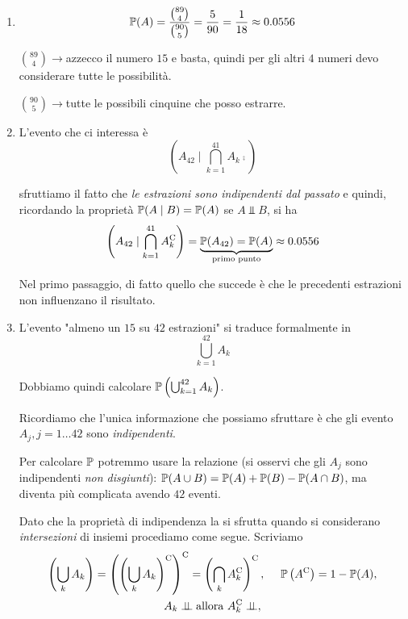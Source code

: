 \begin{enumerate}
\item \begin{equation*}
\mathbb{P}( A) =\frac{\binom{89}{4}}{\binom{90}{5}} =\frac{5}{90} =\frac{1}{18} \approx 0.0556
\end{equation*}

$\binom{89}{4}\rightarrow $azzecco il numero $15$ e basta, quindi per gli altri $4$ numeri devo considerare tutte le possibilità.

$\binom{90}{5}\rightarrow $tutte le possibili cinquine che posso estrarre.
\item L'evento che ci interessa è\begin{equation*}
\left( A_{42} \mid \bigcap _{k=1}^{41} A_{k}\comp\right)
\end{equation*}

sfruttiamo il fatto che \textit{le estrazioni sono indipendenti dal passato} e quindi, ricordando la proprietà $\mathbb{P}( A\mid B) =\mathbb{P}( A)$ se $A\Bot B$, si ha\begin{equation*}
\left( A_{42} \mid\bigcap _{k=1}^{41} A_{k}^{\mathrm{C}}\right) =\underbrace{\mathbb{P}( A_{42}) =\mathbb{P}( A)}_{\text{primo punto}} \approx 0.0556
\end{equation*}

Nel primo passaggio, di fatto quello che succede è che le precedenti estrazioni non influenzano il risultato.
\item L'evento "almeno un $15$ su $42$ estrazioni" si traduce formalmente in\begin{equation*}
\bigcup _{k=1}^{42} A_{k}
\end{equation*}

Dobbiamo quindi calcolare $\mathbb{P}\left(\bigcup _{k=1}^{42} A_{k}\right)$.

Ricordiamo che l'unica informazione che possiamo sfruttare è che gli evento $A_{j} ,j=1\dots 42$ sono \textit{indipendenti}.

Per calcolare $\mathbb{P}$ potremmo usare la relazione (si osservi che gli $A_{j}$ sono indipendenti \textit{non disgiunti}): $\mathbb{P}( A\cup B) =\mathbb{P}( A) +\mathbb{P}( B) -\mathbb{P}( A\cap B)$, ma diventa più complicata avendo $42$ eventi.

Dato che la proprietà di indipendenza la si sfrutta quando si considerano \textit{intersezioni} di insiemi procediamo come segue. Scriviamo\begin{gather*}
\left(\bigcup _{k} A_{k}\right) =\left(\left(\bigcup _{k} A_{k}\right)^{\mathrm{C}}\right)^{\mathrm{C}} =\left(\bigcap _{k} A_{k}^{\mathrm{C}}\right)^{\mathrm{C}} ,\ \ \ \ \mathbb{P}\left( A^{\mathrm{C}}\right) =1-\mathbb{P}( A) ,\\
A_{k} \perp \!\!\! \perp \text{allora} \ A_{k}^{\mathrm{C}} \perp \!\!\! \perp ,
\end{gather*}


\end{enumerate}
